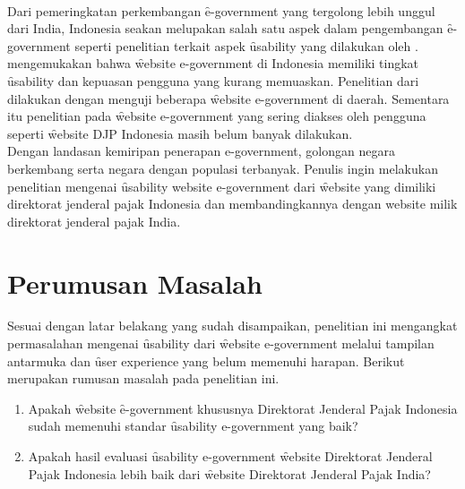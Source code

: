 \newline\\
Dari pemeringkatan perkembangan \f{e-government} yang tergolong lebih unggul dari India, Indonesia seakan melupakan salah satu aspek dalam pengembangan \f{e-government} seperti penelitian terkait aspek \f{usability} yang dilakukan oleh \citet{paper.dahlan}. \citeauthor{paper.dahlan} mengemukakan bahwa \f{website e-government} di Indonesia memiliki tingkat \f{usability} dan kepuasan pengguna yang kurang memuaskan. Penelitian dari \citeauthor{paper.dahlan} dilakukan dengan menguji beberapa \f{website e-government} di daerah. Sementara itu penelitian pada \f{website e-government} yang sering diakses oleh pengguna seperti \f{website} DJP Indonesia masih belum banyak dilakukan. 
\newline\\
Dengan landasan kemiripan penerapan e-government, golongan negara berkembang serta negara dengan populasi terbanyak. Penulis ingin melakukan penelitian mengenai \f{usability website e-government}  dari \f{website} yang dimiliki direktorat jenderal pajak Indonesia dan membandingkannya dengan {website} milik direktorat jenderal pajak India.
\section{Perumusan Masalah}
Sesuai dengan latar belakang yang sudah disampaikan,  penelitian ini mengangkat permasalahan mengenai \f{usability} dari \f{website e-government} melalui tampilan antarmuka dan \f{user experience} yang belum memenuhi harapan. Berikut merupakan rumusan masalah pada penelitian ini.
\begin{enumerate}
	\item Apakah \f{website} \f{e-government} khususnya Direktorat Jenderal Pajak Indonesia sudah memenuhi standar \f{usability e-government} yang baik?
	\item Apakah hasil evaluasi \f{usability e-government} \f{website} Direktorat Jenderal Pajak Indonesia lebih baik dari \f{website} Direktorat Jenderal Pajak India?
\end{enumerate}

